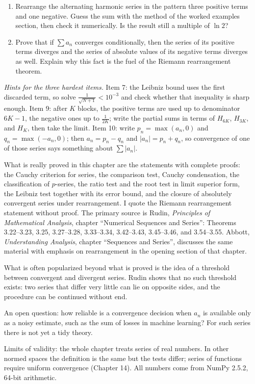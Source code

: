 \begin{latihan}
\begin{enumerate}
\item Rearrange the alternating harmonic series in the pattern three positive terms and one
      negative. Guess the sum with the method of the worked examples section, then check it
      numerically. Is the result still a multiple of $\ln 2$?

\item Prove that if $\sum a_n$ converges conditionally, then the series of its positive
      terms diverges and the series of absolute values of its negative terms diverges as
      well. Explain why this fact is the fuel of the Riemann rearrangement theorem.
\end{enumerate}

\noindent\emph{Hints for the three hardest items.} Item 7: the Leibniz bound uses the
first discarded term, so solve $\frac{1}{\sqrt{N+1}} < 10^{-3}$ and check whether that
inequality is sharp enough. Item 9: after $K$ blocks, the positive terms are used up to
denominator $6K-1$, the negative ones up to $\frac{1}{2K}$; write the partial sums in terms
of $H_{6K}$, $H_{3K}$, and $H_{K}$, then take the limit. Item 10: write
$p_n = \max(a_n, 0)$ and $q_n = \max(-a_n, 0)$; then $a_n = p_n - q_n$ and
$|a_n| = p_n + q_n$, so convergence of one of those series says something about
$\sum |a_n|$.
\end{latihan}

\begin{untukpeneliti}
What is really proved in this chapter are the statements with complete proofs: the Cauchy
criterion for series, the comparison test, Cauchy condensation, the classification of
$p$-series, the ratio test and the root test in limit superior form, the Leibniz test
together with its error bound, and the closure of absolutely convergent series under
rearrangement. I quote the Riemann rearrangement statement without proof. The primary
source is Rudin, \emph{Principles of Mathematical Analysis}, chapter ``Numerical Sequences
and Series'': Theorems 3.22--3.23, 3.25, 3.27--3.28, 3.33--3.34, 3.42--3.43, 3.45--3.46,
and 3.54--3.55. Abbott, \emph{Understanding Analysis}, chapter ``Sequences and Series'',
discusses the same material with emphasis on rearrangement in the opening section of that
chapter.

What is often popularized beyond what is proved is the idea of a threshold between
convergent and divergent series. Rudin shows that no such threshold exists: two series that
differ very little can lie on opposite sides, and the procedure can be continued without
end.

An open question: how reliable is a convergence decision when $a_n$ is available only as a
noisy estimate, such as the sum of losses in machine learning? For such series there is not
yet a tidy theory.

Limits of validity: the whole chapter treats series of real numbers. In other normed spaces
the definition is the same but the tests differ; series of functions require uniform
convergence (Chapter 14). All numbers come from NumPy 2.5.2, 64-bit arithmetic.
\end{untukpeneliti}

